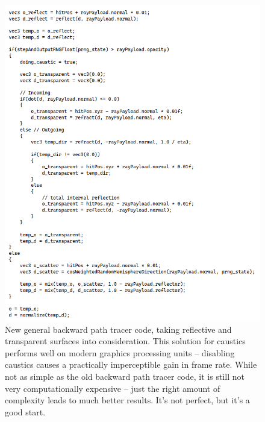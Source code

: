 \documentclass[12pt]{article}
\begin{document}
\begin{figure} 
\centering
  \includegraphics[width = 6 in]{fig4.png}
  \caption{ New general backward path tracer code, taking reflective and transparent surfaces into consideration.
This solution for caustics performs well on modern graphics processing units -- disabling caustics causes a practically imperceptible gain in frame rate.
While not as simple as the old backward path tracer code, it is still not very computationally expensive -- just the right amount of complexity leads to much better results.
It's not perfect, but it's a good start.
}
\end{figure}
\end{document}
